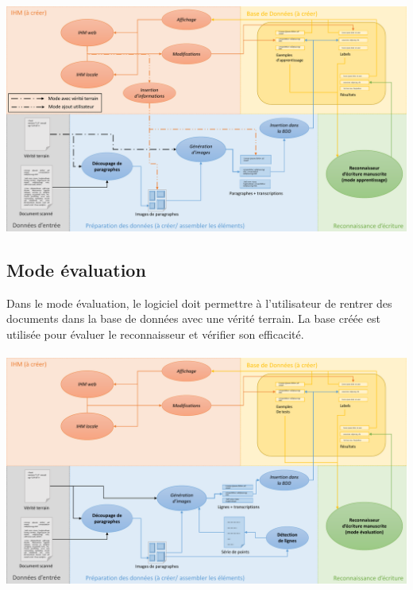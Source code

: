 \paragraph{}
\begin{mdframed}[frametitle={Annexe A.1.2 : Sans détection de lignes}, innerbottommargin=10]
\begin{center}
\includegraphics[width=\linewidth]{schema_mode1.2.pdf}
\end{center}
\end{mdframed}

\subsection{Mode évaluation}

Dans le mode évaluation, le logiciel doit permettre à l’utilisateur de rentrer des documents
dans la base de données avec une vérité terrain. La base créée est utilisée pour évaluer
le reconnaisseur et vérifier son efficacité.

\paragraph{}
\begin{mdframed}[frametitle={Annexe A.2.1 : Avec détection de lignes}, innerbottommargin=10]
\begin{center}
\includegraphics[width=\linewidth]{schema_mode2.1.pdf}
\end{center}
\end{mdframed}


